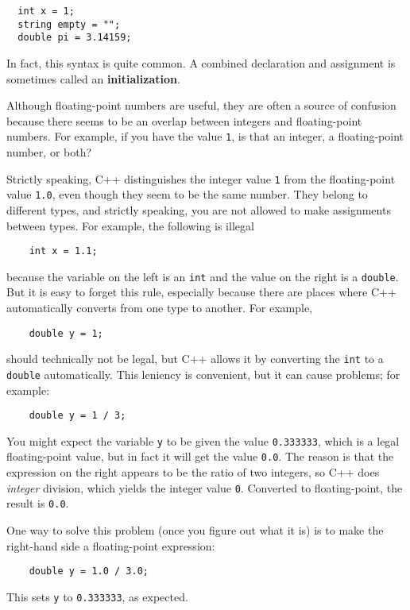 \begin{lstlisting}
  int x = 1;
  string empty = "";
  double pi = 3.14159;
\end{lstlisting}
%
In fact, this syntax is quite common.  A combined declaration
and assignment is sometimes called an {\bf initialization}.


Although floating-point numbers are useful, they are
often a source of confusion because there seems to be an
overlap between integers and floating-point numbers.  For
example, if you have the value {\tt 1}, is that an integer,
a floating-point number, or both?

Strictly speaking, C++ distinguishes the integer value {\tt 1}
from the floating-point value {\tt 1.0}, even though they
seem to be the same number.  They belong to
different types, and strictly speaking, you are not allowed
to make assignments between types.  For example, the following
is illegal

\begin{lstlisting}
    int x = 1.1;
\end{lstlisting}
%
because the variable on the left is an {\tt int}
and the value on the right is a {\tt double}.  But it is easy
to forget this rule, especially because there are places where C++
automatically converts from one type to another.
For example,

\begin{lstlisting}
    double y = 1;
\end{lstlisting}
%
should technically not be legal, but C++ allows it by converting the
{\tt int} to a {\tt double} automatically.  This leniency is
convenient, but it can cause problems; for example:

\begin{lstlisting}
    double y = 1 / 3;
\end{lstlisting}
%
You might expect the variable {\tt y} to be given the value
{\tt 0.333333}, which is a legal floating-point value, but in
fact it will get the value {\tt 0.0}.  The reason is that the
expression on the right appears to be the ratio of two integers,
so C++ does {\em integer} division, which yields the integer
value {\tt 0}.  Converted to floating-point, the result is
{\tt 0.0}.

One way to solve this problem (once you figure out what
it is) is to make the right-hand side a floating-point
expression:

\begin{lstlisting}
    double y = 1.0 / 3.0;
\end{lstlisting}
%
This sets {\tt y} to {\tt 0.333333}, as expected.

